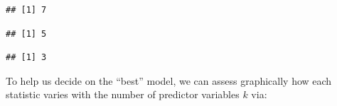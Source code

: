 \documentclass[
]{article}
\newenvironment{Shaded}{\begin{snugshade}}{\end{snugshade}}
\newcommand{\AttributeTok}[1]{\textcolor[rgb]{0.13,0.29,0.53}{#1}}
\newcommand{\FunctionTok}[1]{\textcolor[rgb]{0.13,0.29,0.53}{\textbf{#1}}}
\newcommand{\NormalTok}[1]{#1}
\newcommand{\SpecialCharTok}[1]{\textcolor[rgb]{0.81,0.36,0.00}{\textbf{#1}}}
\begin{document}
\begin{Shaded}
\end{Shaded}

\begin{verbatim}
## [1] 7
\end{verbatim}

\begin{Shaded}
\end{Shaded}

\begin{verbatim}
## [1] 5
\end{verbatim}

\begin{Shaded}
\end{Shaded}

\begin{verbatim}
## [1] 3
\end{verbatim}

To help us decide on the ``best'' model, we can assess graphically how
each statistic varies with the number of predictor variables \(k\) via:
\end{document}
